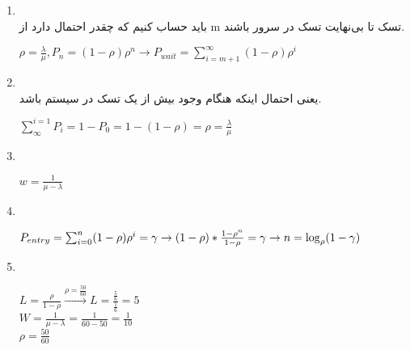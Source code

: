 

\begin{enumerate}
  \item \phantom{text}
        \\
        باید حساب کنیم که چقدر احتمال دارد از m تسک تا بی‌نهایت تسک در سرور باشند.
        \begin{latin}
          $\rho= \frac{\lambda}{\mu},P_n=(1-\rho)\rho^n \rightarrow P_{wait} = \sum_{i=m+1}^{\infty}(1-\rho)\rho^i$
        \end{latin}
  \item \phantom{text}
        \\
        یعنی احتمال اینکه هنگام وجود بیش از یک تسک در سیستم باشد.
        \begin{latin}
          $\sum_{\infty}^{i=1}P_i = 1 - P_0 = 1 - (1-\rho) = \rho = \frac{\lambda}{\mu}$
        \end{latin}
  \item \phantom{text}
        \\
        \begin{latin}
          $w = \frac{1}{\mu-\lambda}$
        \end{latin}
  \item \phantom{text}
        \\
        \begin{latin}
          $P_{entry} = \sum_{i=0}^{n}(1-\rho)\rho^i = \gamma \rightarrow (1-\rho)*\frac{1-\rho^n}{1-\rho}=\gamma \\
            \rightarrow n = \log_{\rho}(1-\gamma)$
        \end{latin}
  \item \phantom{text}
        \\
        \begin{latin}
          $L = \frac{\rho}{1-\rho} \xrightarrow[]{\rho = \frac{50}{60}}L = \frac{\frac{5}{6}}{\frac{1}{6}}= 5$\\
          $W = \frac{1}{\mu-\lambda} = \frac{1}{60-50}=\frac{1}{10}$ \\
          $\rho = \frac{50}{60}$
        \end{latin}
\end{enumerate}





